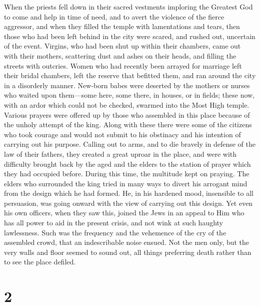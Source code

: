  When the priests fell down in their sacred vestments
imploring the Greatest God to come and help in time of need, and to
avert the violence of the fierce aggressor, and when they filled the
temple with lamentations and tears,  then those who had
been left behind in the city were scared, and rushed out, uncertain of
the event.  Virgins, who had been shut up within their
chambers, came out with their mothers, scattering dust and ashes on
their heads, and filling the streets with outcries.  Women
who had recently been arrayed for marriage left their bridal chambers,
left the reserve that befitted them, and ran around the city in a
disorderly manner.  New-born babes were deserted by the
mothers or nurses who waited upon them---some here, some there, in
houses, or in fields; these now, with an ardor which could not be
checked, swarmed into the Most High temple.  Various
prayers were offered up by those who assembled in this place because of
the unholy attempt of the king.  Along with these there
were some of the citizens who took courage and would not submit to his
obstinacy and his intention of carrying out his purpose. 
Calling out to arms, and to die bravely in defense of the law of their
fathers, they created a great uproar in the place, and were with
difficulty brought back by the aged and the elders to the station of
prayer which they had occupied before.  During this time,
the multitude kept on praying.  The elders who surrounded
the king tried in many ways to divert his arrogant mind from the design
which he had formed.  He, in his hardened mood, insensible
to all persuasion, was going onward with the view of carrying out this
design.  Yet even his own officers, when they saw this,
joined the Jews in an appeal to Him who has all power to aid in the
present crisis, and not wink at such haughty lawlessness. 
Such was the frequency and the vehemence of the cry of the assembled
crowd, that an indescribable noise ensued.  Not the men
only, but the very walls and floor seemed to sound out, all things
preferring death rather than to see the place defiled.

\hypertarget{section-1}{%
\section{2}\label{section-1}}

